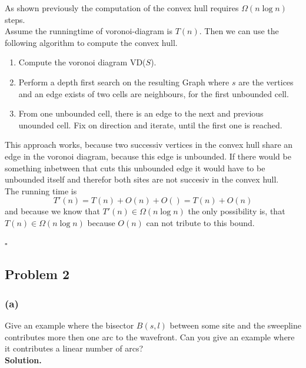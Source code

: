 \documentclass[11pt,a4paper,ngerman]{article}
\begin{document}
As shown previously the computation of the convex hull requires $\Omega (n \log n)$ steps.\\

Assume the runningtime of voronoi-diagram is $T(n)$. Then we can use the following 
algorithm to compute the convex hull.\\

\begin{enumerate}[1.]
    \item Compute the voronoi diagram VD($S$).
    \item Perform a depth first search on the resulting Graph where $s$ are the vertices and
        an edge exists of two cells are neighbours, for the first unbounded cell.
    \item From one unbounded cell, there is an edge to the next and previous unounded cell. Fix
        on direction and iterate, until the first one is reached.
\end{enumerate}

This approach works, because two successiv vertices in the convex hull share an edge in the voronoi diagram,
because this edge is unbounded. If there would be something inbetween that cuts this unbounded edge it would
have to be unbounded itself and therefor both sites are not succesiv in the convex hull.\\

The running time is
    $$ T'(n) = T(n) + O(n) + O() = T(n) + O(n)$$
and because we know that $T'(n) \in \Omega (n \log n)$ the
only possibility is, that $T(n) \in \Omega (n \log n)$ because
$O(n)$ can not tribute to this bound.

\mbox{}\hfill $\square$

\subsection*{Problem 2}

\subsubsection*{(a)}

Give an example where the bisector $B(s,l)$ between some site and the sweepline
contributes more then one arc to the wavefront. Can you give an example where
it contributes a linear number of arcs?\\

\textbf{Solution.}\\
\end{document}
